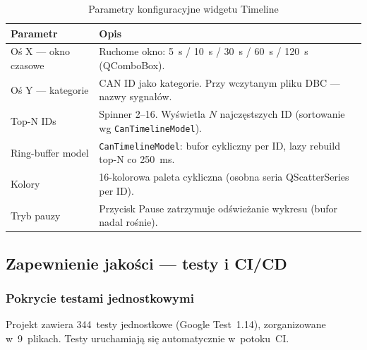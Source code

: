 \documentclass[12pt, a4paper]{article}
\begin{document}
\begin{table}[H]
\caption{Parametry konfiguracyjne widgetu Timeline}
\label{tab:timeline}
\centering
\small
\begin{tabular}{p{4.5cm}p{10.0cm}}
\toprule
\textbf{Parametr} & \textbf{Opis} \\
\midrule
Oś X --- okno czasowe &
  Ruchome okno: 5~s / 10~s / 30~s / 60~s / 120~s (QComboBox). \\
Oś Y --- kategorie &
  CAN ID jako kategorie. Przy wczytanym pliku DBC --- nazwy sygnałów. \\
Top-N IDs &
  Spinner 2--16. Wyświetla $N$ najczęstszych ID (sortowanie wg \texttt{CanTimelineModel}). \\
Ring-buffer model &
  \texttt{CanTimelineModel}: bufor cykliczny per ID, lazy rebuild top-N co 250~ms. \\
Kolory &
  16-kolorowa paleta cykliczna (osobna seria QScatterSeries per ID). \\
Tryb pauzy &
  Przycisk Pause zatrzymuje odświeżanie wykresu (bufor nadal rośnie). \\
\bottomrule
\end{tabular}
\end{table}

\subsection{Zapewnienie jakości --- testy i CI/CD}

\subsubsection*{Pokrycie testami jednostkowymi}

Projekt zawiera 344~testy jednostkowe (Google Test~1.14), zorganizowane
w~9~plikach. Testy uruchamiają się automatycznie w~potoku~CI.
\end{document}
